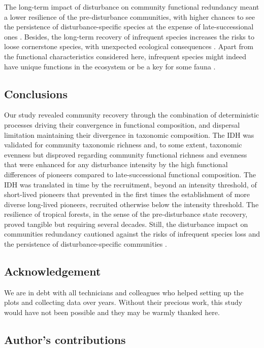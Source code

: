 \documentclass[
  11pt,
  french,
  A4paper,
  extrafontsizes,onecolumn,openright
  ]{memoir}
\begin{document}
The long-term impact of disturbance on community functional redundancy
meant a lower resilience of the pre-disturbance communities, with higher
chances to see the persistence of disturbance-specific species at the
expense of late-successional ones \autocite{Haddad2008}. Besides, the
long-term recovery of infrequent species increases the risks to loose
cornerstone species, with unexpected ecological consequences
\autocites{Jones1994}{Chazdon2003a}{Diaz2005}. Apart from the functional
characteristics considered here, infrequent species might indeed have
unique functions in the ecosystem or be a key for some fauna
\autocite{Schleuning2016}.

\subsection{Conclusions}\label{conclusions}

Our study revealed community recovery through the combination of
deterministic processes driving their convergence in functional
composition, and dispersal limitation maintaining their divergence in
taxonomic composition. The IDH was validated for community taxonomic
richness and, to some extent, taxonomic evenness but disproved regarding
community functional richness and evenness that were enhanced for any
disturbance intensity by the high functional differences of pioneers
compared to late-successional functional composition. The IDH was
translated in time by the recruitment, beyond an intensity threshold, of
short-lived pioneers that prevented in the first times the establishment
of more diverse long-lived pioneers, recruited otherwise below the
intensity threshold. The resilience of tropical forests, in the sense of
the pre-disturbance state recovery, proved tangible but requiring
several decades. Still, the disturbance impact on communities redundancy
cautioned against the risks of infrequent species loss and the
persistence of disturbance-specific communities \autocite{Herault2018}.

\subsection{Acknowledgement}\label{acknowledgement}

We are in debt with all technicians and colleagues who helped setting up
the plots and collecting data over years. Without their precious work,
this study would have not been possible and they may be warmly thanked
here.

\subsection{Author's contributions}\label{authors-contributions}
\end{document}
